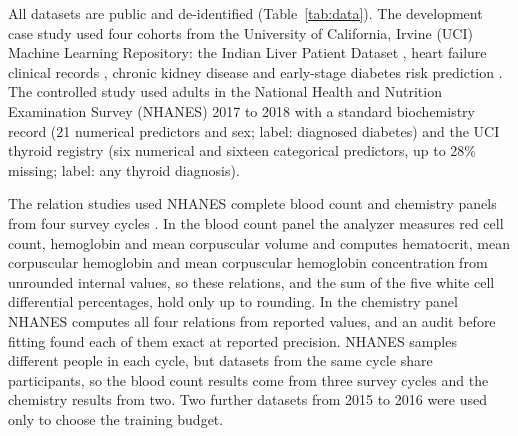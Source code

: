 \documentclass[pdflatex,referee]{sn-jnl}%
\begin{document}
All datasets are public and de-identified (Table~\ref{tab:data}). The development case study used four cohorts from the University of California, Irvine (UCI) Machine Learning Repository: the Indian Liver Patient Dataset \cite{ilpd}, heart failure clinical records \cite{heartfailure,chicco2020}, chronic kidney disease \cite{ckd} and early-stage diabetes risk prediction \cite{diabetes}. The controlled study used adults in the National Health and Nutrition Examination Survey (NHANES) 2017 to 2018 \cite{nhanes2017} with a standard biochemistry record (21 numerical predictors and sex; label: diagnosed diabetes) and the UCI thyroid registry \cite{thyroid} (six numerical and sixteen categorical predictors, up to 28\% missing; label: any thyroid diagnosis).

The relation studies used NHANES complete blood count and chemistry panels from four survey cycles \cite{nhanes2011,nhanes2013,nhanes2017,nhanes2021}. In the blood count panel the analyzer measures red cell count, hemoglobin and mean corpuscular volume and computes hematocrit, mean corpuscular hemoglobin and mean corpuscular hemoglobin concentration from unrounded internal values, so these relations, and the sum of the five white cell differential percentages, hold only up to rounding. In the chemistry panel NHANES computes all four relations from reported values, and an audit before fitting found each of them exact at reported precision. NHANES samples different people in each cycle, but datasets from the same cycle share participants, so the blood count results come from three survey cycles and the chemistry results from two. Two further datasets from 2015 to 2016 \cite{nhanes2015} were used only to choose the training budget.
\end{document}
